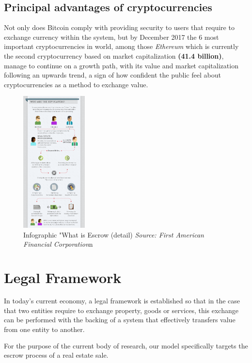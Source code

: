 \documentclass[submission,copyright,creativecommons]{eptcs}
\begin{document}
\subsection{Principal advantages of cryptocurrencies}
Not only does Bitcoin comply with providing security to users that require to exchange currency within the system, but by December 2017\cite{MostImportantCryptocurrencies} the 6 most important cryptocurrencies in world, among those \textit{Ethereum} which is currently the second cryptocurrency based on market capitalization \textbf{(41.4 billion)}, manage to continue on a growth path, with its value and market capitalization following an upwards trend, a sign of how confident the public feel about cryptocurrencies as a method to exchange value.

\begin{figure}
    \centering
    \includegraphics[width=0.30\textwidth]{infog-what-is-escrow_detail.png}
    \caption{Infographic "What is Escrow (detail)\cite{WhatEscrow} \textit{Source: First American Financial Corporation}n}
    \label{fig:info_escrow}
\end{figure}
\vspace{3cm}
\section{Legal Framework}
In today's current economy, a legal framework is established so that in the case that two entities require to exchange property, goods or services, this exchange can be performed with the backing of a system that effectively transfers value from one entity to another.

For the purpose of the current body of research, our model specifically targets the escrow process of a real estate sale. 
\end{document}

